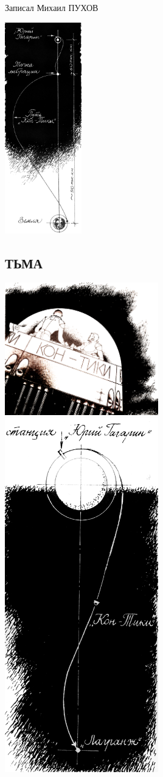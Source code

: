 \documentclass[11pt,a4paper,oneside]{article}
\begin{document}
Записал Михаил ПУХОВ

\includegraphics[width=0.25\textwidth]{ug2}

\subsection{ТЬМА}
\label{darkness}

\includegraphics[width=0.5\textwidth]{darkness}
\includegraphics[width=0.5\textwidth]{darkness2}
\end{document}
